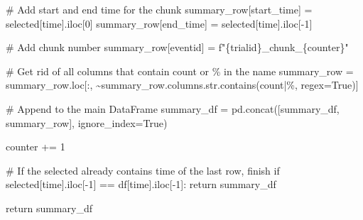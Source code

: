 \documentclass[
  letterpaper,
  DIV=11,
  numbers=noendperiod]{scrreprt}
\newenvironment{Shaded}{\begin{snugshade}}{\end{snugshade}}
\newcommand{\BuiltInTok}[1]{\textcolor[rgb]{0.00,0.23,0.31}{#1}}
\newcommand{\CommentTok}[1]{\textcolor[rgb]{0.37,0.37,0.37}{#1}}
\newcommand{\ControlFlowTok}[1]{\textcolor[rgb]{0.00,0.23,0.31}{#1}}
\newcommand{\DecValTok}[1]{\textcolor[rgb]{0.68,0.00,0.00}{#1}}
\newcommand{\NormalTok}[1]{\textcolor[rgb]{0.00,0.23,0.31}{#1}}
\newcommand{\OperatorTok}[1]{\textcolor[rgb]{0.37,0.37,0.37}{#1}}
\newcommand{\SpecialCharTok}[1]{\textcolor[rgb]{0.37,0.37,0.37}{#1}}
\newcommand{\SpecialStringTok}[1]{\textcolor[rgb]{0.13,0.47,0.30}{#1}}
\newcommand{\StringTok}[1]{\textcolor[rgb]{0.13,0.47,0.30}{#1}}
\newcommand{\VariableTok}[1]{\textcolor[rgb]{0.07,0.07,0.07}{#1}}
\begin{document}
\begin{Shaded}
\begin{Highlighting}[]
        \CommentTok{\# Add start and end time for the chunk}
\NormalTok{        summary\_row[}\StringTok{\textquotesingle{}start\_time\textquotesingle{}}\NormalTok{] }\OperatorTok{=}\NormalTok{ selected[}\StringTok{\textquotesingle{}time\textquotesingle{}}\NormalTok{].iloc[}\DecValTok{0}\NormalTok{]}
\NormalTok{        summary\_row[}\StringTok{\textquotesingle{}end\_time\textquotesingle{}}\NormalTok{] }\OperatorTok{=}\NormalTok{ selected[}\StringTok{\textquotesingle{}time\textquotesingle{}}\NormalTok{].iloc[}\OperatorTok{{-}}\DecValTok{1}\NormalTok{]}

        \CommentTok{\# Add chunk number}
\NormalTok{        summary\_row[}\StringTok{\textquotesingle{}eventid\textquotesingle{}}\NormalTok{] }\OperatorTok{=} \SpecialStringTok{f"}\SpecialCharTok{\{}\NormalTok{trialid}\SpecialCharTok{\}}\SpecialStringTok{\_chunk\_}\SpecialCharTok{\{}\NormalTok{counter}\SpecialCharTok{\}}\SpecialStringTok{"}

        \CommentTok{\# Get rid of all columns that contain \textquotesingle{}count\textquotesingle{} or \textquotesingle{}\%\textquotesingle{} in the name}
\NormalTok{        summary\_row }\OperatorTok{=}\NormalTok{ summary\_row.loc[:, }\OperatorTok{\textasciitilde{}}\NormalTok{summary\_row.columns.}\BuiltInTok{str}\NormalTok{.contains(}\StringTok{\textquotesingle{}count|\%\textquotesingle{}}\NormalTok{, regex}\OperatorTok{=}\VariableTok{True}\NormalTok{)]}

        \CommentTok{\# Append to the main DataFrame}
\NormalTok{        summary\_df }\OperatorTok{=}\NormalTok{ pd.concat([summary\_df, summary\_row], ignore\_index}\OperatorTok{=}\VariableTok{True}\NormalTok{)}

\NormalTok{        counter }\OperatorTok{+=} \DecValTok{1}

        \CommentTok{\# If the selected already contains time of the last row, finish}
        \ControlFlowTok{if}\NormalTok{ selected[}\StringTok{\textquotesingle{}time\textquotesingle{}}\NormalTok{].iloc[}\OperatorTok{{-}}\DecValTok{1}\NormalTok{] }\OperatorTok{==}\NormalTok{ df[}\StringTok{\textquotesingle{}time\textquotesingle{}}\NormalTok{].iloc[}\OperatorTok{{-}}\DecValTok{1}\NormalTok{]:}
            \ControlFlowTok{return}\NormalTok{ summary\_df}

    \ControlFlowTok{return}\NormalTok{ summary\_df}
\end{Highlighting}
\end{Shaded}
\end{document}
